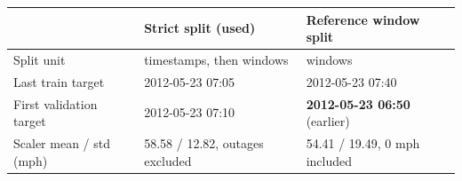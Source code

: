 \begin{tabular}{@{}lll@{}}
\toprule
 & Strict split (used) & Reference window split \\
\midrule
Split unit & timestamps, then windows & windows \\
Last train target & 2012-05-23 07:05 & 2012-05-23 07:40 \\
First validation target & 2012-05-23 07:10 & \textbf{2012-05-23 06:50} (earlier) \\
Scaler mean / std (mph) & 58.58 / 12.82, outages excluded & 54.41 / 19.49, 0 mph included \\
\bottomrule
\end{tabular}
